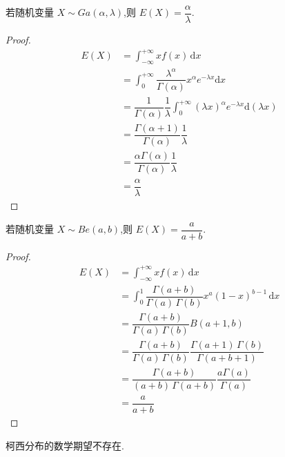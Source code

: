\begin{conclusion}
    \indent 若随机变量 $X \sim Ga(\alpha,\lambda)$,则 $E(X) = \dfrac{\alpha}{\lambda}$.
\end{conclusion}

\begin{proof}
    $$
    \begin{aligned}
        E(X) &= \int_{-\infty}^{+\infty} x f(x) \, \text{d}x \\
        &= \int_{0}^{+\infty} \dfrac{\lambda^\alpha}{\Gamma(\alpha)} x^\alpha e^{-\lambda x} \text{d}x \\
        &= \dfrac{1}{\Gamma(\alpha)} \dfrac{1}{\lambda} \int_{0}^{+\infty} (\lambda x)^\alpha e^{-\lambda x} \text{d}(\lambda x) \\
        &= \dfrac{\Gamma(\alpha + 1)}{\Gamma(\alpha)} \dfrac{1}{\lambda} \\
        &= \dfrac{\alpha \Gamma(\alpha)}{\Gamma(\alpha)} \dfrac{1}{\lambda} \\
        &= \dfrac{\alpha}{\lambda}
    \end{aligned}
    $$
\end{proof}

\begin{conclusion}
    \indent 若随机变量 $X \sim Be(a,b)$,则 $E(X) = \dfrac{a}{a+b}$.
\end{conclusion}

\begin{proof}
    $$
    \begin{aligned}
        E(X) &= \int_{-\infty}^{+\infty} x f(x) \, \text{d}x \\
        &= \int_{0}^{1} \dfrac{\Gamma(a+b)}{\Gamma(a) \, \Gamma(b)} x^a (1-x)^{b-1} \, \text{d}x \\
        &= \dfrac{\Gamma(a+b)}{\Gamma(a) \, \Gamma(b)} B(a+1,b) \\
        &= \dfrac{\Gamma(a+b)}{\Gamma(a) \, \Gamma(b)} \dfrac{\Gamma(a+1) \, \Gamma(b)}{\Gamma(a+b+1)} \\
        &= \dfrac{\Gamma(a+b)}{(a+b) \, \Gamma(a+b)} \dfrac{a \Gamma(a)}{\Gamma(a)} \\
        &= \dfrac{a}{a+b}
    \end{aligned}
    $$
\end{proof}

\begin{conclusion}
    \indent 柯西分布的数学期望不存在.
\end{conclusion}

